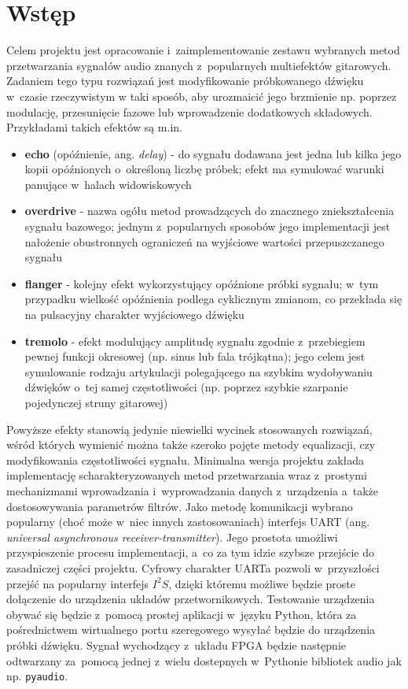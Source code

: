 \section{Wstęp}

Celem projektu jest opracowanie i~zaimplementowanie zestawu wybranych metod przetwarzania sygnałów audio znanych z~popularnych multiefektów gitarowych. Zadaniem tego typu rozwiązań jest modyfikowanie próbkowanego dźwięku w~czasie rzeczywistym w taki sposób, aby urozmaicić jego brzmienie np. poprzez modulację, przesunięcie fazowe lub wprowadzenie dodatkowych składowych. Przykładami takich efektów są m.in.

\begin{itemize}
    \item \textbf{echo} (opóźnienie, ang. \textit{delay}) - do sygnału dodawana jest jedna lub kilka jego kopii opóźnionych o~określoną liczbę próbek; efekt ma symulować warunki panujące w~halach widowiskowych
    \item \textbf{overdrive} - nazwa ogółu metod prowadzących do znacznego zniekształcenia sygnału bazowego; jednym z~popularnych sposobów jego implementacji jest nałożenie obustronnych ograniczeń na wyjściowe wartości przepuszczanego sygnału
    \item \textbf{flanger} - kolejny efekt wykorzystujący opóźnione próbki sygnału; w~tym przypadku wielkość opóźnienia podlega cyklicznym zmianom, co przekłada się na pulsacyjny charakter wyjściowego dźwięku
    \item \textbf{tremolo} - efekt modulujący amplitudę sygnału zgodnie z~przebiegiem pewnej funkcji okresowej (np. sinus lub fala trójkątna); jego celem jest symulowanie rodzaju artykulacji polegającego na szybkim wydobywaniu dźwięków o~tej samej częstotliwości (np. poprzez szybkie szarpanie pojedynczej struny gitarowej) 
\end{itemize}

Powyższe efekty stanowią jedynie niewielki wycinek stosowanych rozwiązań, wśród których wymienić można także szeroko pojęte metody equalizacji, czy modyfikowania częstotliwości sygnału. Minimalna wersja projektu zakłada implementację scharakteryzowanych metod przetwarzania wraz z~prostymi mechanizmami wprowadzania i~wyprowadzania danych z~urządzenia a~także dostosowywania parametrów filtrów. Jako metodę komunikacji wybrano popularny (choć może w~niec innych zastosowaniach) interfejs UART (ang. \textit{universal asynchronous receiver-transmitter}). Jego prostota umożliwi przyspieszenie procesu implementacji, a~co za tym idzie szybsze przejście do zasadniczej części projektu. Cyfrowy charakter UARTa pozwoli w~przyszłości przejść na popularny interfejs $I^{2}S$, dzięki któremu możliwe będzie proste dołączenie do urządzenia układów przetwornikowych. Testowanie urządzenia obywać się będzie z~pomocą prostej aplikacji w~języku Python, która za pośrednictwem wirtualnego portu szeregowego wysyłać będzie do urządzenia próbki dźwięku. Sygnał wychodzący z~układu FPGA będzie następnie odtwarzany za~pomocą jednej z~wielu dostepnych w~Pythonie bibliotek audio jak np. \verb|pyaudio|.
